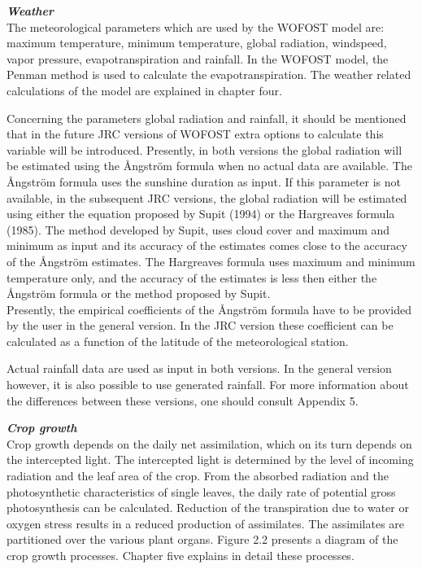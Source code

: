 \documentclass[11pt]{article}
\begin{document}
{\bf {\it Weather\/}}\\
The meteorological parameters which are used by the WOFOST model are: maxi\-mum
temperature, minimum temperature, global radiation, windspeed, vapor pressure,
evapotranspiration and rainfall. In the WOFOST model, the Penman method is used to
calculate the evapotr\-anspiration. The weather related calculations of the model are
explained in chapter four.

\bigskip
Concerning the parameters global radiation and rainfall, it should be mentioned that in the
future JRC versions of WOFOST extra options to calculate this variable will be intro\-duced. Presently, in both versions the global radiation will be estimated using the \AA ngs\-tr\"{o}m formula when no actual data are available. The \AA ngs\-tr\"{o}m formula uses the sunshine
duration as input. If this parame\-ter is not available, in the subsequent JRC versions, the
global radiation will be estimated using either the equation proposed by Supit (1994) or
the Hargre\-aves formula (1985). The method developed by Supit, uses cloud cover and
maximum and minimum as input and its accuracy of the estimates comes close to the
accuracy of the \AA ngs\-tr\"{o}m estimates. The Hargreaves formula uses maximum and
minimum temperature only, and the accuracy of the estimates is less then either the \AA ngs\-tr\"{o}m formula or the method proposed by Supit.\\
Presently, the empirical coefficients of the \AA ngs\-tr\"{o}m formula have to be provided by the
user in the general version. In the JRC version these coefficient can be calculated as a
function of the latitude of the meteorological station.

\bigskip
Actual rainfall data are used as input in both versions. In the general version however, it
is also possible to use generated rainfall. For more informa\-tion about the differences
between these versions, one should consult Appendix 5.

\bigskip
\bigskip
{\bf {\it Crop growth\/}}\\
Crop growth depends on the daily net assimilation, which on its turn depends on the
intercepted light. The intercepted light is determined by the level of incoming radiation
and the leaf area of the crop. From the absorbed radiation and the photosynthetic
characteristics of single leaves, the daily rate of potential gross photosynthesis can be
calculated. Reduction of the transpiration due to water or oxygen stress results in a
reduced production of assimilates. The assimilates are partitioned over the various plant
organs. Figure 2.2 presents a diagram of the crop growth processes. Chapter five explains
in detail these processes.
\end{document}
